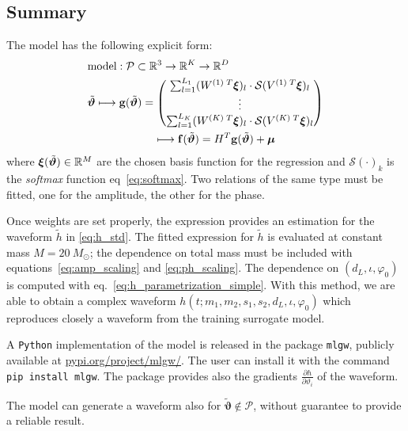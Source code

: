 \subsection{Summary}
The model has the following explicit form:
\begin{align}
	& \textrm{model}: \mathcal{P} \subset \mathbb{R}^3 \rightarrow \mathbb{R}^K \rightarrow \mathbb{R}^D \nonumber\\
	& {\tilde{\boldsymbol{\vartheta}}}
	\longmapsto  \mathbf{g}({\tilde{\boldsymbol{\vartheta}}} ) = 
		\begin{pmatrix}
		\sum_{l=1}^{L_1} (W^{(1)\;T} \boldsymbol{\xi})_l \cdot \mathcal{S}(V^{(1)\;T}\boldsymbol{\xi})_l \\
		\vdots \\
		\sum_{l=1}^{L_K}  (W^{(K)\;T} \boldsymbol{\xi})_l \cdot \mathcal{S}(V^{(K)\;T}\boldsymbol{\xi})_l
		\end{pmatrix}
	\nonumber \\	
	& \qquad \qquad \qquad \longmapsto \mathbf{f}({\tilde{\boldsymbol{\vartheta}}} ) = H^T \mathbf{g}({\tilde{\boldsymbol{\vartheta}}} ) + \boldsymbol{\mu} \label{eq:model}
\end{align}
where ${\boldsymbol{\xi}}({\tilde{\boldsymbol{\vartheta}}}) \in \mathbb{R}^M $ are the chosen basis function for the regression and $\mathcal{S}(\cdot)_k$ is the \textit{softmax} function eq~\eqref{eq:softmax}.
Two relations of the same type must be fitted, one for the amplitude, the other for the phase.
\par
Once weights are set properly, the expression provides an estimation for the waveform $\tilde{h}$ in \eqref{eq:h_std}.
The fitted expression for  $\tilde{h}$ is evaluated at constant mass $M = \SI{20}{M_\odot}$; the dependence on total mass must be included with equations~\eqref{eq:amp_scaling} and \eqref{eq:ph_scaling}.
The dependence on $(d_L, \iota, \varphi_0)$ is computed with eq.~\eqref{eq:h_parametrization_simple}.
With this method, we are able to obtain a complex waveform $h(t;m_1,m_2, s_1, s_2, d_L, \iota, \varphi_0)$ which reproduces closely a waveform from the training surrogate model.
\par
A \texttt{Python} implementation of the model is released in the package \texttt{mlgw}, publicly available at \href{https://pypi.org/project/mlgw/}{pypi.org/project/mlgw/}. The user can install it with the command \texttt{pip install mlgw}.
The package provides also the gradients $\frac{\partial h}{\partial \vartheta_i}$ of the waveform.
\par
The model can generate a waveform also for $\tilde{\boldsymbol{\vartheta}} \notin \mathcal{P}$, without guarantee to provide a reliable result.
